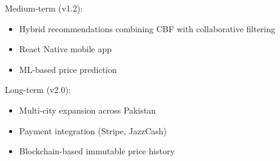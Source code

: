 Medium-term (v1.2):
\begin{itemize}
  \item Hybrid recommendations combining CBF with collaborative filtering
  \item React Native mobile app
  \item ML-based price prediction
\end{itemize}

Long-term (v2.0):
\begin{itemize}
  \item Multi-city expansion across Pakistan
  \item Payment integration (Stripe, JazzCash)
  \item Blockchain-based immutable price history
\end{itemize}
